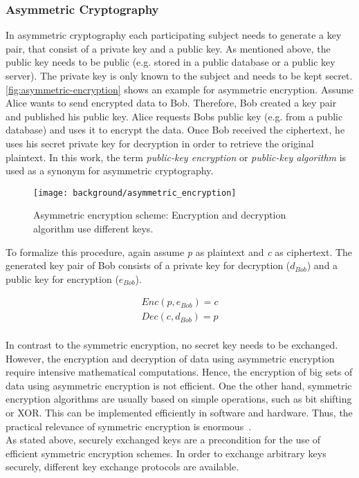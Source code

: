 \subsubsection{Asymmetric Cryptography}

In asymmetric cryptography each participating subject needs to generate a key pair, that consist of a private key and a public key. As mentioned above, the public key needs to be public (e.g. stored in a public database or a public key server). The private key is only known to the subject and needs to be kept secret.
\autoref{fig:asymmetric-encryption} shows an example for asymmetric encryption. Assume Alice wants to send encrypted data to Bob. Therefore, Bob created a key pair and published his public key. Alice requests Bobs public key (e.g. from a public database) and uses it to encrypt the data. Once Bob received the ciphertext, he uses his secret private key for decryption in order to retrieve the original  plaintext. In this work, the term \textit{public-key encryption} or \textit{public-key algorithm} is used as a synonym for asymmetric cryptography.

\begin{figure}[htpb]
  \centering
  \texttt{[image: background/asymmetric\_encryption]}
  \caption[Asymmetric encryption scheme]{Asymmetric encryption scheme: Encryption and decryption algorithm use different keys.} \label{fig:asymmetric-encryption}
\end{figure}
To formalize this procedure, again assume \textit{p} as plaintext and \textit{c} as ciphertext. The generated key pair of Bob consists of a private key for decryption ($d_{Bob}$) and a public key for encryption ($e_{Bob}$).

\begin{align*}
Enc(p, e_{Bob}) = c\\
Dec(c, d_{Bob}) = p
\end{align*}
\\
In contrast to the symmetric encryption, no secret key needs to be exchanged. However, the encryption and decryption of data using asymmetric encryption require intensive mathematical computations. Hence, the encryption of big sets of data using asymmetric encryption is not efficient.
One the other hand, symmetric encryption algorithms are usually based on simple operations, such as bit shifting or XOR. This can be implemented efficiently in software and hardware. Thus, the practical relevance of symmetric encryption is enormous~\parencite{ITSicherheit}.
\\
As stated above, securely exchanged keys are a precondition for the use of efficient symmetric encryption schemes. In order to exchange arbitrary keys securely, different key exchange protocols are available.

